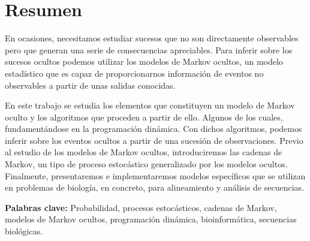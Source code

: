 \chapter*{Resumen}
En ocasiones, necesitamos estudiar sucesos que no son directamente observables pero que generan una serie de consecuencias apreciables. Para inferir sobre los sucesos ocultos podemos utilizar los modelos de Markov ocultos, un modelo estadístico que es capaz de proporcionarnos información de eventos no observables a partir de unas salidas conocidas. 

En este trabajo se estudia los elementos que constituyen un modelo de Markov oculto y los algoritmos que proceden a partir de ello. Algunos de los cuales, fundamentándose en la  programación dinámica. Con dichos algoritmos, podemos inferir sobre los eventos ocultos a partir de una sucesión de observaciones. Previo al estudio de los modelos de Markov ocultos, introduciremos las cadenas de Markov, un tipo de proceso estocástico generalizado por los modelos ocultos. Finalmente, presentaremos e implementaremos modelos específicos que se utilizan en problemas de biología, en concreto, para alineamiento y análisis de secuencias.

\textbf{Palabras clave:} Probabilidad, procesos estocásticos, cadenas de Markov, modelos de Markov ocultos, programación dinámica, bioinformática, secuencias biológicas.